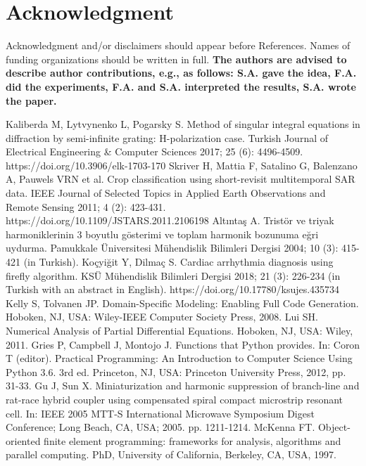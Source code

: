 \documentclass{elektr}
\begin{document}
\section*{Acknowledgment}
Acknowledgment and/or disclaimers should appear before References. Names of funding organizations should be written in full. \textbf{The authors are advised to describe author contributions, e.g., as follows: S.A. gave the idea, F.A. did the experiments, F.A. and S.A. interpreted the results, S.A. wrote the paper.} 

\begin{thebibliography}{99}
 Kaliberda M, Lytvynenko L, Pogarsky S. Method of singular integral equations in diffraction by semi-infinite grating: H-polarization case. Turkish Journal of Electrical Engineering \& Computer Sciences 2017; 25 (6): 4496-4509. https://doi.org/10.3906/elk-1703-170 
 Skriver H, Mattia F, Satalino G, Balenzano A, Pauwels VRN et al. Crop classification using short-revisit multitemporal SAR data. IEEE Journal of Selected Topics in Applied Earth Observations and Remote Sensing 2011; 4 (2): 423-431. https://doi.org/10.1109/JSTARS.2011.2106198
 Alt{\i}nta\c{s} A. Trist\"{o}r ve triyak harmoniklerinin 3 boyutlu g\"{o}sterimi ve toplam harmonik bozunuma e\u{g}ri uydurma. Pamukkale \"{U}niversitesi M\"{u}hendislik Bilimleri Dergisi 2004; 10 (3): 415-421 (in Turkish).
 Ko\c{c}yi\u{g}it Y, Dilma\c{c} S. Cardiac arrhythmia diagnosis using firefly algorithm. KS\"{U} M\"{u}hendislik Bilimleri Dergisi 2018; 21 (3): 226-234 (in Turkish with an abstract in English). https://doi.org/10.17780/ksujes.435734 
 Kelly S, Tolvanen JP. Domain-Specific Modeling: Enabling Full Code Generation. Hoboken, NJ, USA: Wiley-IEEE Computer Society Press, 2008.
 Lui SH. Numerical Analysis of Partial Differential Equations. Hoboken, NJ, USA: Wiley, 2011.
 Gries P, Campbell J, Montojo J. Functions that Python provides. In: Coron T (editor). Practical Programming: An Introduction to Computer Science Using Python 3.6. 3rd ed. Princeton, NJ, USA: Princeton University Press, 2012, pp. 31-33.
 Gu J, Sun X. Miniaturization and harmonic suppression of branch-line and rat-race hybrid coupler using compensated spiral compact microstrip resonant cell. In: IEEE 2005 MTT-S International Microwave Symposium Digest Conference; Long Beach, CA, USA; 2005. pp. 1211-1214.
 McKenna FT. Object-oriented finite element programming: frameworks for analysis, algorithms and parallel computing. PhD, University of California, Berkeley, CA, USA, 1997.
\end{thebibliography}
\end{document}
